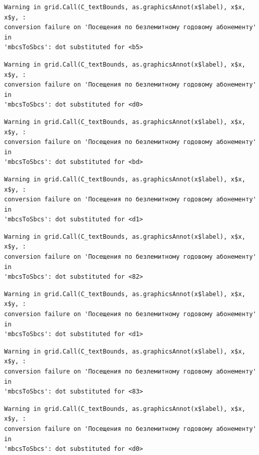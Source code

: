 \documentclass[
  letterpaper,
  DIV=11,
  numbers=noendperiod]{scrartcl}
\begin{document}
\begin{verbatim}
Warning in grid.Call(C_textBounds, as.graphicsAnnot(x$label), x$x, x$y, :
conversion failure on 'Посещения по безлемитному годовому абонементу' in
'mbcsToSbcs': dot substituted for <b5>
\end{verbatim}

\begin{verbatim}
Warning in grid.Call(C_textBounds, as.graphicsAnnot(x$label), x$x, x$y, :
conversion failure on 'Посещения по безлемитному годовому абонементу' in
'mbcsToSbcs': dot substituted for <d0>
\end{verbatim}

\begin{verbatim}
Warning in grid.Call(C_textBounds, as.graphicsAnnot(x$label), x$x, x$y, :
conversion failure on 'Посещения по безлемитному годовому абонементу' in
'mbcsToSbcs': dot substituted for <bd>
\end{verbatim}

\begin{verbatim}
Warning in grid.Call(C_textBounds, as.graphicsAnnot(x$label), x$x, x$y, :
conversion failure on 'Посещения по безлемитному годовому абонементу' in
'mbcsToSbcs': dot substituted for <d1>
\end{verbatim}

\begin{verbatim}
Warning in grid.Call(C_textBounds, as.graphicsAnnot(x$label), x$x, x$y, :
conversion failure on 'Посещения по безлемитному годовому абонементу' in
'mbcsToSbcs': dot substituted for <82>
\end{verbatim}

\begin{verbatim}
Warning in grid.Call(C_textBounds, as.graphicsAnnot(x$label), x$x, x$y, :
conversion failure on 'Посещения по безлемитному годовому абонементу' in
'mbcsToSbcs': dot substituted for <d1>
\end{verbatim}

\begin{verbatim}
Warning in grid.Call(C_textBounds, as.graphicsAnnot(x$label), x$x, x$y, :
conversion failure on 'Посещения по безлемитному годовому абонементу' in
'mbcsToSbcs': dot substituted for <83>
\end{verbatim}

\begin{verbatim}
Warning in grid.Call(C_textBounds, as.graphicsAnnot(x$label), x$x, x$y, :
conversion failure on 'Посещения по безлемитному годовому абонементу' in
'mbcsToSbcs': dot substituted for <d0>
\end{verbatim}
\end{document}

